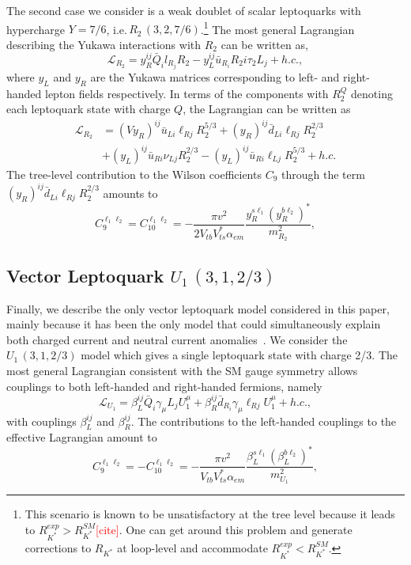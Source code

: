 \documentclass[12pt]{revtex4-2}
\numberwithin{equation}{section}
\begin{document}
The second case we consider is a weak doublet of scalar leptoquarks with hypercharge $Y=7/6$, i.e.\,$R_{2}\,(3, 2, 7/6)$.\footnote{This scenario is known to be unsatisfactory at the tree level because it leads to $R_{K^{*}}^{exp} > R_{K^{*}}^{SM}$\textcolor{red}{[cite]}. One can get around this problem and generate corrections to $R_{K^{*}}$ at loop-level and accommodate $R_{K^{*}}^{exp} < R_{K^{*}}^{SM}$.} The most general Lagrangian describing the Yukawa interactions with $R_2$ can be written as,
\begin{equation}
    \mathcal{L}_{R_2} = y^{ij}_{R}\bar{Q}_{i}l_{R_{j}}R_{2} - y^{ij}_{L}\bar{u}_{R_{i}}R_{2}i\tau_{2}L_{j} + h.c.,
\end{equation}
where $y_{L}$ and $y_{R}$ are the Yukawa matrices corresponding to left- and right-handed lepton fields respectively.  In terms of the components with $R_2^Q$ denoting each leptoquark state with charge $Q$, the Lagrangian can be written as 
\begin{align}\nonumber
    \mathcal{L}_{R_{2}} &= (V y_{R})^{ij} \bar{u}_{Li} \ell_{Rj} R_{2}^{5/3} + (y_{R})^{ij}\bar{d}_{Li} \ell_{Rj} R_{2}^{2/3}\\
    &+ (y_{L})^{ij}\bar{u}_{Ri}\nu_{Lj} R_{2}^{2/3} - (y_{L})^{ij}\bar{u}_{Ri} \ell_{Lj} R_{2}^{5/3} + h.c.
\end{align}
The tree-level contribution to the Wilson coefficients $C_9$ through the term $ (y_{R})^{ij}\bar{d}_{Li} \ell_{Rj} R_{2}^{2/3} $ amounts to 
\begin{equation}\label{R2-C9}
    C^{\ell_1 \ell_2}_{9} = C^{\ell_1 \ell_2}_{10} = -\frac{\pi v^{2}}{2 V_{tb}V^{*}_{ts}\alpha_{em}}\frac{y^{s\ell_1}_{R}(y_{R}^{b\ell_2})^{*}}{m^{2}_{R_{2}}},
\end{equation}



\subsection{Vector Leptoquark $U_{1}\,(3,1,2/3)$}

Finally, we describe the only vector leptoquark model considered in this paper, mainly because it has been the only model that could simultaneously explain both charged current and neutral current anomalies~\cite{Angelescu:2018tyl}.  We consider the $U_{1}\,(3,1,2/3)$ model which gives a single leptoquark state with charge 2/3. The most general Lagrangian consistent with the SM gauge symmetry allows couplings to both left-handed and right-handed fermions, namely
\begin{equation}
    \mathcal{L}_{U_{1}} = \beta^{ij}_{L} \bar{Q}_{i}\gamma_{\mu} L_{j} U^{\mu}_{1} + \beta^{ij}_{R}\bar{d}_{R_{i}}\gamma_{\mu} \ell_{Rj}  U_{1}^{\mu} + h.c.,
\end{equation}
with couplings $\beta^{ij}_{L}$ and $\beta_{R}^{ij}$. The contributions to the left-handed couplings to the effective Lagrangian amount to
\begin{equation}\label{U1-C9}
    C^{\ell_1 \ell_2}_{9} = - C_{10}^{\ell_1 \ell_2} = -\frac{\pi v^{2}}{V_{tb}V^{*}_{ts}\alpha_{em}}\frac{\beta_{L}^{s\ell_1}(\beta^{b\ell_2}_{L})^{*}}{m^{2}_{U_{1}}},
\end{equation}
\end{document}
